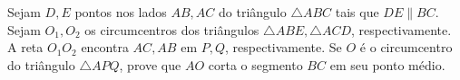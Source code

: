 Sejam $D,E$ pontos nos lados $AB, AC$ do triângulo $\triangle{ABC}$ tais que $DE\parallel BC$. Sejam $O_1,O_2$ os circumcentros dos triângulos $\triangle{ABE},\triangle{ACD}$, respectivamente. A reta $O_1O_2$ encontra $AC,AB$ em $P,Q$, respectivamente. Se $O$ é o circumcentro do triângulo $\triangle{APQ}$, prove que $AO$ corta o segmento $BC$ em seu ponto médio.
